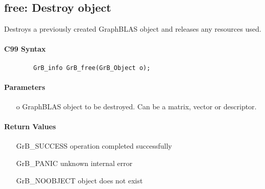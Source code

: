 \subsection{{\sf free}: Destroy object}

Destroys a previously created GraphBLAS object and releases any resources used.

\paragraph{C99 Syntax}

\begin{verbatim}
        GrB_info GrB_free(GrB_Object o);
\end{verbatim}


\paragraph{Parameters}

\begin{itemize}[leftmargin=1.1in]
	\item[{\sf o}] GraphBLAS object to be destroyed. Can be a matrix, vector or descriptor.
\end{itemize}

\paragraph{Return Values}

\begin{itemize}[leftmargin=2.1in]
\item[{\sf GrB\_SUCCESS}]        operation completed successfully
\item[{\sf GrB\_PANIC}]          unknown internal error
\item[{\sf GrB\_NOOBJECT}]       object does not exist
\end{itemize}
